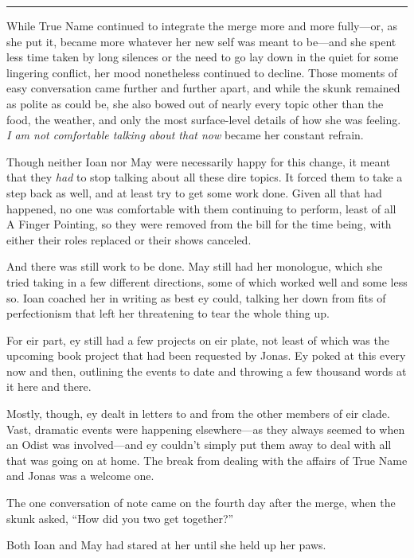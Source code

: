 \begin{center}\rule{0.5\linewidth}{0.5pt}\end{center}
\pagebreak

While True Name continued to integrate the merge more and more fully—or, as she put it, became more whatever her new self was meant to be—and she spent less time taken by long silences or the need to go lay down in the quiet for some lingering conflict, her mood nonetheless continued to decline. Those moments of easy conversation came further and further apart, and while the skunk remained as polite as could be, she also bowed out of nearly every topic other than the food, the weather, and only the most surface-level details of how she was feeling. \emph{I am not comfortable talking about that now} became her constant refrain.

Though neither Ioan nor May were necessarily happy for this change, it meant that they \emph{had} to stop talking about all these dire topics. It forced them to take a step back as well, and at least try to get some work done. Given all that had happened, no one was comfortable with them continuing to perform, least of all A Finger Pointing, so they were removed from the bill for the time being, with either their roles replaced or their shows canceled.

And there was still work to be done. May still had her monologue, which she tried taking in a few different directions, some of which worked well and some less so. Ioan coached her in writing as best ey could, talking her down from fits of perfectionism that left her threatening to tear the whole thing up.

For eir part, ey still had a few projects on eir plate, not least of which was the upcoming book project that had been requested by Jonas. Ey poked at this every now and then, outlining the events to date and throwing a few thousand words at it here and there.

Mostly, though, ey dealt in letters to and from the other members of eir clade. Vast, dramatic events were happening elsewhere—as they always seemed to when an Odist was involved—and ey couldn't simply put them away to deal with all that was going on at home. The break from dealing with the affairs of True Name and Jonas was a welcome one.

The one conversation of note came on the fourth day after the merge, when the skunk asked, ``How did you two get together?''

Both Ioan and May had stared at her until she held up her paws.

